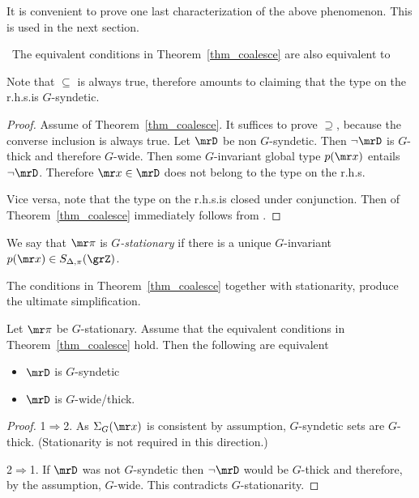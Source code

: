 It is convenient to prove one last characterization of the above phenomenon.
This is used in the next section. 

\begin{proposition}\label{prop_coalese}\ 
  The equivalent conditions in Theorem~\ref{thm_coalesce} are also equivalent to\smallskip

\end{proposition}

Note that $\subseteq$ is always true, therefore  amounts to claiming that the type on the r.h.s.\@ is $G$-syndetic.
\begin{proof} 
  Assume  of Theorem~\ref{thm_coalesce}.
  It suffices to prove $\supseteq$, because the converse inclusion is always true. 
  Let $\mrD$ be non $G$-syndetic.
  Then $\neg\mrD$ is $G$-thick and therefore $G$-wide.
  Then some $G$-invariant global type $p({\mr x})$ entails $\neg\mrD$.
  Therefore ${\mr x}\in\mrD$ does not belong to the type on the r.h.s.
  
  Vice versa, note that the type on the r.h.s.\@ is closed under conjunction.
  Then \ssf2 of Theorem~\ref{thm_coalesce} immediately follows from \ssf5.
\end{proof}

We say that ${\mr\pi}$ is \emph{$G$-stationary\/} if there is a unique $G$-in\-var\-iant $p({\mr x})\in S_{\Delta,\pi}(\grZ)$.


The conditions in Theorem~\ref{thm_coalesce} together with stationarity, produce the ultimate simplification.

\begin{fact}\label{fact_stationarity}
  Let ${\mr\pi}$ be $G$-stationary. 
  Assume that the equivalent conditions in Theorem~\ref{thm_coalesce} hold.
  Then the following are equivalent
  \begin{itemize}
    \item [1.] $\mrD$ is $G$-syndetic
    \item [2.] $\mrD$ is $G$-wide/thick.
  \end{itemize}
\end{fact}

\begin{proof}
  1$\Rightarrow$2.
  As $\Sigma_G({\mr x})$ is consistent by assumption, $G$-syndetic sets are $G$-thick.
  (Stationarity is not required in this direction.)

  2$\Rightarrow$1.
  If $\mrD$ was not $G$-syndetic then $\neg\mrD$ would be $G$-thick and therefore, by the assumption, $G$-wide.
  This contradicts $G$-stationarity.
\end{proof}

